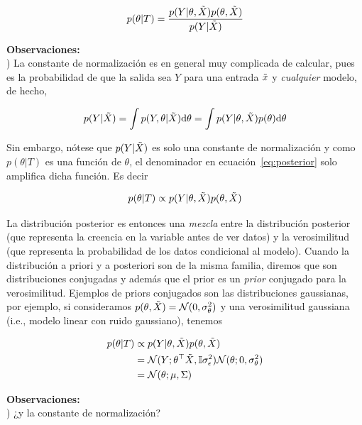 \begin{equation}
	p(\theta|T)=\frac{p(Y|\theta,\tilde{X})p(\theta,\tilde{X})}{p(Y|\tilde{X})}
	\label{eq:posterior}
\end{equation}

\noindent\textbf{Observaciones:}\\

) La constante de normalización es en general muy complicada de calcular, pues es la probabilidad de que la salida sea $Y$ para una entrada $\tilde{x}$ y \emph{cualquier} modelo, de hecho, 

\begin{equation}
		p(Y|\tilde{X}) 	= 	\int p(Y,\theta|\tilde{X}){\text d} \theta 
					= 	\int p(Y|\theta,\tilde{X}) p(\theta) {\text d} \theta
\end{equation}

Sin embargo, nótese que $p(Y|\tilde{X})$ es solo una constante de normalización y como $p(\theta|T)$ es una función de $\theta$, el denominador en ecuación~\eqref{eq:posterior} solo amplifica dicha función. Es decir 

\begin{equation}
	p(\theta|T)\propto p(Y|\theta,\tilde{X})p(\theta,\tilde{X})
	\label{eq:posterior2}
\end{equation}

La distribución posterior es entonces una \emph{mezcla} entre la distribución posterior (que representa la creencia en la variable antes de ver datos) y la verosimilitud (que representa la probabilidad de los datos condicional al modelo). Cuando la distribución a priori y a posteriori son de la misma familia, diremos que son distribuciones conjugadas y además que el prior es un \emph{prior} conjugado para la verosimilitud. Ejemplos de priors conjugados son las distribuciones gaussianas, por ejemplo, si consideramos $p(\theta,\tilde{X}) = {\mathcal N}(0,\sigma_\theta^2)$ y una verosimilitud gaussiana (i.e., modelo linear con ruido gaussiano), tenemos

\begin{align}
	p(\theta|T)	&\propto p(Y|\theta,\tilde{X})p(\theta,\tilde{X})\\
				&= {\mathcal N}(Y;\theta^\top\tilde{X},{\mathbb I}\sigma_\epsilon^2){\mathcal N}(\theta;0,\sigma_\theta^2)\\
				&={\mathcal N}(\theta; \mu,\Sigma)
\end{align}

\noindent\textbf{Observaciones:}\\
) ¿y la constante de normalización?

